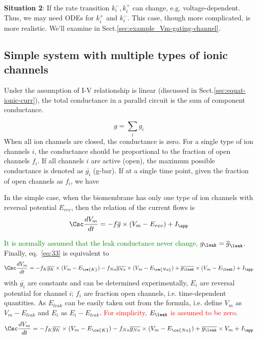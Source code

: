 {\bf Situation 2}: If the rate transition $k_i^-, k_i^+$ can change,
e.g. voltage-dependent. Thus, we may need ODEs for $k^+_i$ and
$k^-_i$. This case, though more complicated, is more realistic. We'll
examine in Sect.\ref{sec:example_Vm-gating-channel}.

\subsection{Simple system with multiple types of ionic channels}
\label{sec:solv-electr-prop}

Under the assumption of I-V relationship is linear (discussed in
Sect.\ref{sec:equat-ionic-curr}), the total conductance in a parallel circuit is
the sum of component conductance.

\begin{equation}
  \label{eq:51}
  g = \sum_i g_i
\end{equation}
When all ion channels are closed, the conductance is zero. For a
single type of ion channels $i$, the conductance should be
proportional to the fraction of open channels $f_i$. If
all channels $i$ are active (open), the maximum possible conductance
is denoted as $\overline{g_i}$ (g-bar). If at a single time point, given
the fraction of open channels as $f_i$, we have


In the simple case, when the biomembrane has only one type of ion
channels with reversal potential $E_{rev}$, then the relation of the
current flows is
\begin{equation}
  \label{eq:35}
  \Csc \frac{dV_m}{dt} =  -f\overline{g} \times (V_m-E_{rev}) + I_\app
\end{equation}

\textcolor{green}{It is normally assumed that the leak conductance never
  change, $g_{\leak}=\overline{g}_{\leak}$}.
Finally, eq.~\eqref{eq:33} is equivalent to
\begin{equation}
  \label{eq:52}
  \Csc \frac{dV_m}{dt} =  -f_K\overline{g_K} \times (V_m-E_{\ce{K}})
  -f_{Na}\overline{g_{Na}} \times (V_m-E_{\ce{Na}})+ \overline{g_{\leak}} \times (V_m-E_{\leak}) + I_\app
\end{equation}
with $\overline{g_i}$ are constants and can be determined experimentally,
$E_i$ are reversal potential for channel $i$; $f_i$ are fraction open
channels, i.e. time-dependent quantities.  As $E_{leak}$ can be easily
taken out from the formula, i.e. define $V_m$ as $V_m-E_{leak}$ and
$E_i$ as $E_i-E_{leak}$.
\textcolor{red}{For simplicity, $E_{\leak}$ is assumed to be zero}.
\begin{equation}
  \label{eq:929}
  \Csc \frac{dV_m}{dt} =  -f_K\overline{g_K} \times (V_m-E_{\ce{K}})
  -f_{Na}\overline{g_{Na}} \times (V_m-E_{\ce{Na}})+ \overline{g_{\leak}} \times V_m + I_\app
\end{equation}

